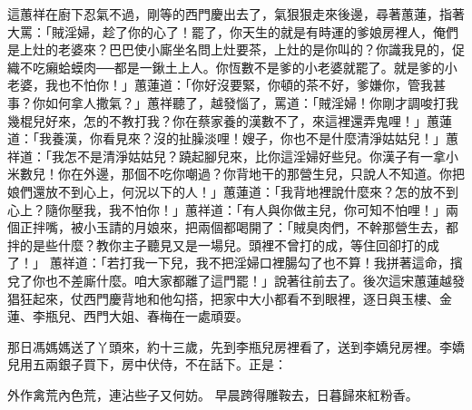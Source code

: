 這蕙祥在廚下忍氣不過，剛等的西門慶出去了，氣狠狠走來後邊，尋著蕙蓮，指著大罵：「賊淫婦，趁了你的心了！罷了，你天生的就是有時運的爹娘房裡人，俺們是上灶的老婆來？巴巴使小廝坐名問上灶要茶，上灶的是你叫的？你識我見的，促織不吃癩蛤蟆肉──都是一鍬土上人。你恆數不是爹的小老婆就罷了。就是爹的小老婆，我也不怕你！」蕙蓮道：「你好沒要緊，你頓的茶不好，爹嫌你，管我甚事？你如何拿人撒氣？」蕙祥聽了，越發惱了，罵道：「賊淫婦！你剛才調唆打我幾棍兒好來，怎的不教打我？你在蔡家養的漢數不了，來這裡還弄鬼哩！」蕙蓮道：「我養漢，你看見來？沒的扯臊淡哩！嫂子，你也不是什麼清淨姑姑兒！」蕙祥道：「我怎不是清淨姑姑兒？蹺起腳兒來，比你這淫婦好些兒。你漢子有一拿小米數兒！你在外邊，那個不吃你嘲過？你背地干的那營生兒，只說人不知道。你把娘們還放不到心上，何況以下的人！」蕙蓮道：「我背地裡說什麼來？怎的放不到心上？隨你壓我，我不怕你！」蕙祥道：「有人與你做主兒，你可知不怕哩！」兩個正拌嘴，被小玉請的月娘來，把兩個都喝開了：「賊臭肉們，不幹那營生去，都拌的是些什麼？教你主子聽見又是一場兒。頭裡不曾打的成，等住回卻打的成了！」 蕙祥道：「若打我一下兒，我不把淫婦口裡腸勾了也不算！我拼著這命，擯兌了你也不差廝什麼。咱大家都離了這門罷！」說著往前去了。後次這宋蕙蓮越發猖狂起來，仗西門慶背地和他勾搭，把家中大小都看不到眼裡，逐日與玉樓、金蓮、李瓶兒、西門大姐、春梅在一處頑耍。

那日馮媽媽送了丫頭來，約十三歲，先到李瓶兒房裡看了，送到李嬌兒房裡。李嬌兒用五兩銀子買下，房中伏侍，不在話下。正是：

外作禽荒內色荒，連沾些子又何妨。
早晨跨得雕鞍去，日暮歸來紅粉香。


